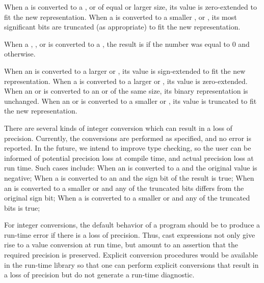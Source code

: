 When a  is converted to a , 
or  of equal or larger size, its value is zero-extended to fit the
new representation.  When a  is converted to a
smaller ,  or , its most significant
bits are truncated (as appropriate) to fit the new representation.

When a , , or  is converted to a , the result is  if the number was equal to 0 and  otherwise.

When an  is converted to a larger  or , its value is
sign-extended to fit the new representation.  
When a  is converted to a larger  or , its value
is zero-extended.
When an  or  is converted to an  or 
of the same size, its binary representation is unchanged.
When an  or  is converted to a smaller 
or , its value is truncated to fit the new representation.

\begin{future}
There are several kinds of integer conversion which can result in a loss of
precision.  Currently, the conversions are performed as specified, and no error
is reported.  In the future, we intend to improve type checking, so the user can
be informed of potential precision loss at compile time, and actual precision
loss at run time.  Such cases include:
%
When an  is converted to a  and the original value is
negative;
When a  is converted to an  and the sign bit of the result
is true;
When an  is converted to a smaller  or  and any
of the truncated bits differs from the original sign bit;
%
When a  is converted to a smaller  or  and any
of the truncated bits is true;
\end{future}

\begin{rationale}
For integer conversions, the default behavior of a program should be to produce
a run-time error if there is a loss of precision.  Thus, cast expressions not only
give rise to a value conversion at run time, but amount to an assertion
that the required precision is preserved.  Explicit conversion procedures would be
available in the run-time library so that one can perform explicit conversions
that result in a loss of precision but do not generate a run-time diagnostic.
\end{rationale}

